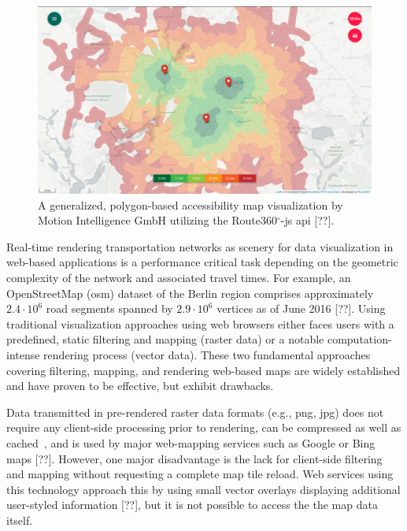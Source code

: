     \begin{figure}[htb]
      \centering
      \includegraphics[width=\linewidth]
        {./img/screenshot-r360js-demo.png}
      \caption{A generalized, polygon-based accessibility map visualization
        by Motion Intelligence GmbH utilizing the Route360$^\circ$-\acrshort{js}
        \acrshort{api} [??].}
      \label{fig:intro:r360d}
    \end{figure}

    Real-time rendering transportation networks as scenery for data
    visualization in web-based applications is a performance critical task
    depending on the geometric complexity of the network and associated travel
    times. For example, an OpenStreetMap (\acrshort{osm}) dataset of the Berlin
    region comprises approximately $2.4 \cdot 10^6$ road segments spanned by
    $2.9 \cdot 10^6$ vertices as of June 2016 [??]. Using traditional
    visualization
    approaches using web browsers either faces users with a predefined, static
    filtering and mapping (raster data) or a notable computation-intense
    rendering process (vector data). These two fundamental approaches covering
    filtering, mapping, and rendering web-based maps are widely established and
    have proven to be effective, but exhibit drawbacks.\par

    Data transmitted in pre-rendered raster data formats (e.g., \acrshort{png},
    \acrshort{jpg}) does
    not require any client-side processing prior to rendering, can be compressed
    as well as cached~\cite{ESRI2006}, and is used by major web-mapping services
    such as Google or Bing maps [??]. However, one major disadvantage is the
    lack for client-side filtering and mapping without requesting a complete map
    tile reload. Web services using this technology approach this by using small
    vector overlays displaying additional user-styled information [??], but it
    is not possible to access the the map data itself.\par

